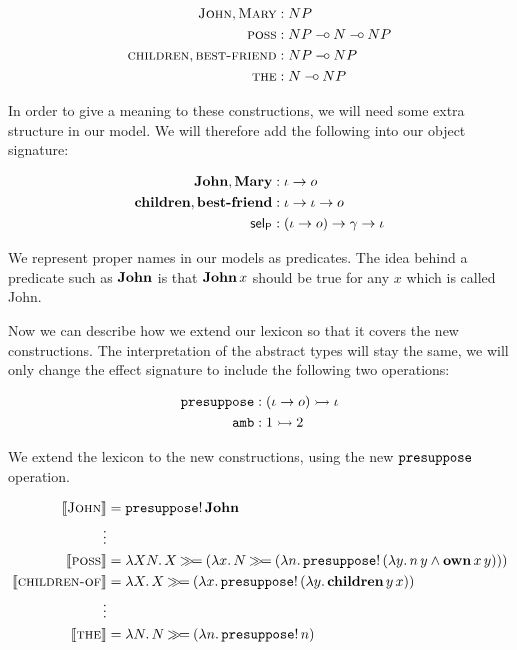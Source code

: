 \begin{align*}
  \textsc{John}, \textsc{Mary} &: NP \\
  \textsc{poss} &: NP \mathbin{{-}\mkern-3.5mu{\circ}} N \mathbin{{-}\mkern-3.5mu{\circ}} NP \\
  \textsc{children}, \textsc{best-friend} &: NP \mathbin{{-}\mkern-3.5mu{\circ}} NP \\
  \textsc{the} &: N \mathbin{{-}\mkern-3.5mu{\circ}} NP
\end{align*}

In order to give a meaning to these constructions, we will need some extra
structure in our model. We will therefore add the following into our
object signature:

\begin{align*}
  \textbf{John}, \textbf{Mary} &: \iota \to o \\
  \textbf{children}, \textbf{best-friend} &: \iota \to \iota \to o \\
  \textsf{sel}_{\textsf{P}} &: (\iota \to o) \to \gamma \to \iota
\end{align*}

We represent proper names in our models as predicates. The idea behind a
predicate such as $\textbf{John}$ is that $\textbf{John}\,x$ should be true
for any $x$ which is called John.

Now we can describe how we extend our lexicon so that it covers the new
constructions. The interpretation of the abstract types will stay the same,
we will only change the effect signature to include the following two
operations:

\begin{align*}
\mathtt{presuppose} &: (\iota \to o) \rightarrowtail \iota \\
\mathtt{amb} &: 1 \rightarrowtail 2
\end{align*}

We extend the lexicon to the new constructions, using the new
$\mathtt{presuppose}$ operation.

\begin{align*}
  \llbracket \textsc{John} \rrbracket &= \mathtt{presuppose}!\,\textbf{John} \\
  \vdots \\
  \llbracket \textsc{poss} \rrbracket &= \lambda X N.\, X \mathbin{\gg\!=} (\lambda x.\, N \mathbin{\gg\!=} (\lambda n.\, \mathtt{presuppose}!\,(\lambda y.\, n\,y \land \textbf{own}\,x\,y))) \\
  \llbracket \textsc{children-of} \rrbracket &= \lambda X.\, X \mathbin{\gg\!=} (\lambda x.\, \mathtt{presuppose}!\,(\lambda y.\, \textbf{children}\,y\,x)) \\
  \vdots \\
  \llbracket \textsc{the} \rrbracket &= \lambda N.\, N \mathbin{\gg\!=} (\lambda n.\, \mathtt{presuppose}!\,n)
\end{align*}

